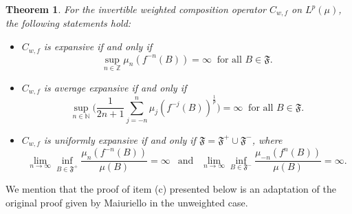 \documentclass[12pt]{article}
\theoremstyle{plain}
\newtheorem{theorem}{Theorem}%
\theoremstyle{definition}
\newcommand{\N}{\mathbb{N}} %
\newcommand{\Z}{\mathbb{Z}} %
\newcommand{\fF}{\mathfrak{F}}
\begin{document}
\begin{theorem}\label{ExpLp-T1}
For the invertible weighted composition operator $C_{w,f}$ on $L^p(\mu)$, the following statements hold:
\begin{itemize}
\item [\rm (a)] $C_{w,f}$ is expansive if and only if 
    \[ 
    \sup_{n \in \Z} \mu_n(f^{-n}(B)) = \infty \ \text{ for all } B \in \fF.
    \]
\item [\rm (b)] $C_{w,f}$ is average expansive if and only if
   \[
    \sup_{n \in \N} \Big(\frac{1}{2n+1} \sum_{j=-n}^n \mu_j(f^{-j}(B))^\frac{1}{p}\Big) = \infty \ \text{ for all } B \in \fF.
    \]
\item [\rm (c)] $C_{w,f}$ is uniformly expansive if and only if $\fF = \fF^{+} \cup \fF^{-}$, where
    \[
    \lim_{n \to \infty} \inf_{B \in \fF^+} \frac{\mu_n(f^{-n}(B))}{\mu(B)} = \infty \ \ \text{ and } \ \
    \lim_{n \to \infty} \inf_{B \in \fF^-} \frac{\mu_{-n}(f^n(B))}{\mu(B)} = \infty.
    \]
\end{itemize}
\end{theorem}

We mention that the proof of item (c) presented below is an adaptation of the original proof given by Maiuriello \cite{MMai22} 
in the unweighted case.
\end{document}
